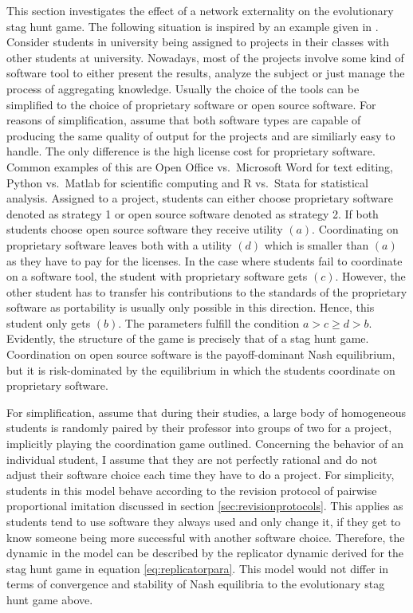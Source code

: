 \label{sec:simplemodel}
This section investigates the effect of a network externality on the
evolutionary stag hunt game. The following situation is inspired by an
example given in \textcite{kandori_learning_1993}. 
Consider students in university being assigned to
projects in their classes with other students at university. 
Nowadays, most of the projects involve some kind of software tool to either 
present the results, analyze the subject or just manage the process of aggregating 
knowledge. Usually the choice of the tools can be simplified to 
the choice of proprietary software or open source software. 
For reasons of simplification, assume that both 
software types are capable of producing
the same quality of output for the projects and are similiarly easy to handle.
The only difference is the high license cost for proprietary software.
Common examples of this are Open Office vs.\ Microsoft Word for text editing,
Python vs.\ Matlab for scientific computing and R vs.\ Stata for statistical
analysis. Assigned to a project, students can either choose proprietary
software denoted as strategy 1 or open source software denoted as strategy 2.
If both students choose open source software they receive utility $(a)$.
Coordinating on proprietary software leaves both with a utility $(d)$ which is
smaller than $(a)$ as they have to pay for the licenses. In the case 
where students fail to coordinate on a software tool, the student
with proprietary software gets $(c)$. However, the other student
has to transfer his contributions to the standards of the proprietary software
as portability is usually only possible in this direction.
Hence, this student only gets $(b)$. The parameters fulfill 
the condition $a > c \geq d >b$.
Evidently, the structure of the game is precisely that of a stag hunt game. 
Coordination on open source software is the payoff-dominant Nash equilibrium,
but it is risk-dominated by the equilibrium in which the students 
coordinate on proprietary software. 

For simplification, assume that during their studies, a large body of 
homogeneous students is randomly paired by their professor into groups of two 
for a project, implicitly playing the coordination game outlined. 
Concerning the behavior of an individual student, I assume that they are 
not perfectly rational and do not adjust their software choice 
each time they have to do a project.
For simplicity, students in this model behave according to the 
revision protocol of pairwise proportional imitation discussed in section 
\ref{sec:revisionprotocols}. 
This applies as students tend to use software they always used and 
only change it, if they get to know someone being more successful with
another software choice. Therefore, the dynamic in the model can be 
described by the replicator dynamic derived for the stag hunt game in 
equation \eqref{eq:replicatorpara}.
This model would not differ in terms of convergence and stability of Nash 
equilibria to the evolutionary stag hunt game above.

